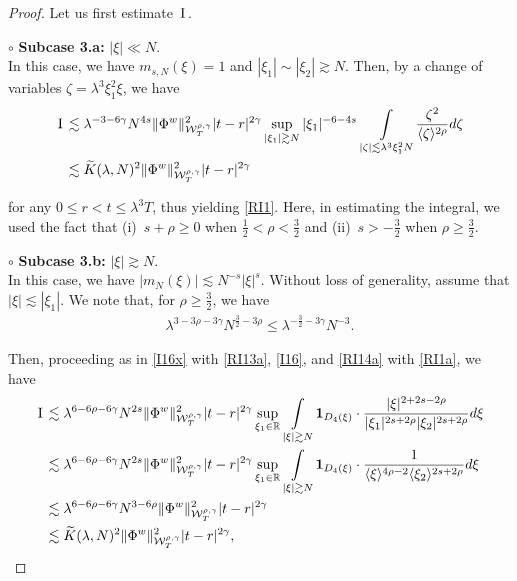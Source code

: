 \documentclass[letterpaper, 11pt,  reqno]{amsart}
\DeclareMathOperator*{\intt}{\int}
\newcommand{\1}{\hspace{0.5mm}\text{I}\hspace{0.5mm}}
\newcommand{\noi}{\noindent}
\newcommand{\R}{\mathbb{R}}
\newcommand{\g}{\gamma}
\newcommand{\ld}{\lambda}
\newcommand{\wt}{\widetilde}
\newcommand{\les}{\lesssim}
\newcommand{\ges}{\gtrsim}
\newcommand{\jb}[1]
{\langle #1 \rangle}
\newcommand{\ind}{\mathbf 1}
\newcommand{\W}{\mathcal{W}}
\newcommand{\z}{\zeta}
\numberwithin{equation}{section}
\numberwithin{theorem}{section}
\begin{document}
\begin{proof}
Let us first estimate $\1$.



\noi
$\circ$ {\bf Subcase 3.a:}  $|\xi| \ll N$.\\
\indent
In this case, we have $m_{s, N}(\xi) = 1$
and  $|\xi_1|\sim |\xi_2|\ges N$.
Then, by 
a change of variables $\z = \ld^3 \xi_1^2 \xi$, we have 
\begin{align*}
\1
& \les 
\ld^{-3- 6\g}N^{ 4s}
 \| \Phi^{w} \|^2_{\W_{T}^{\rho, \g}}  
|t-r|^{2\g}
\sup_{|\xi_1|\ges N}|\xi_1|^{-6-4s}
\intt_{ |\z|\les \ld^3 \xi_1^2N } \frac{\z^{2}}{\jb{\z}^{2\rho}}d \z\\
 &\les 
\wt K(\ld, N)^2
 \| \Phi^{w} \|^2_{\W_{T}^{\rho, \g}}  
|t-r|^{2\g}
\end{align*}

\noi
for any $0\leq r<t\leq \ld^3T$, 
thus yielding \eqref{RI1}.
Here, 
in estimating the integral, 
we used the fact that 
(i)~$s+ \rho \ge 0$
when $\frac 12< \rho < \frac 32$
and 
(ii)~$s > -\frac 32$ when $\rho \ge \frac 32$.







\medskip


\noi
$\circ$ {\bf Subcase 3.b:}  $|\xi| \ges N$.\\
\indent
In this case, we have   $|m_N(\xi)| \les  N^{-s} |\xi|^{s}$.
Without loss of generality, assume that $|\xi|\les |\xi_1|$.
We note that, for $\rho \ge \frac 32$, we have 
\begin{align}
\ld^{3- 3\rho-3\g} N^{\frac 32 - 3\rho}
\le
\ld^{ - \frac 32  - 3\g} N^{-3}.
\label{RI14a}
\end{align}

\noi
Then, 
proceeding as in \eqref{I16x}
with 
 \eqref{RI13a}, 
\eqref{I16}, 
and 
\eqref{RI14a} with \eqref{RI1a}, we have
\begin{align}
\begin{split}
\1
&\les 
\ld^{6-  6\rho  - 6\g}N^{2s }
\| \Phi^{w} \|^2_{\W_{T}^{\rho, \g}} 
|t-r|^{2\g} 
\sup_{\xi_1 \in \R}
\intt_{|\xi|\ges N}
\ind_{D_4(\xi)}\cdot
\frac{|\xi|^{2+2s-2\rho} }{|\xi_1|^{2s+2\rho}|\xi_2|^{2s+2\rho}}d\xi \\
&\les 
\ld^{6-  6\rho  - 6\g}N^{2s }
\| \Phi^{w} \|^2_{\W_{T}^{\rho, \g}} 
|t-r|^{2\g} 
\sup_{\xi_1 \in \R}
\intt_{|\xi|\ges N}
\ind_{D_4(\xi)}\cdot
\frac{1 }{\jb{\xi}^{4\rho - 2}\jb{\xi_2}^{2s+2\rho}}d\xi \\
 &\les 
\ld^{6-6\rho -6\g}N^{3-6\rho }
 \| \Phi^{w} \|^2_{\W_{T}^{\rho, \g}}  
|t-r|^{2\g}\\
 &\les 
\wt K(\ld, N)^2
 \| \Phi^{w} \|^2_{\W_{T}^{\rho, \g}}  
|t-r|^{2\g}, 
\end{split}
\label{RI14x}
\end{align}


\end{proof}
\end{document}
